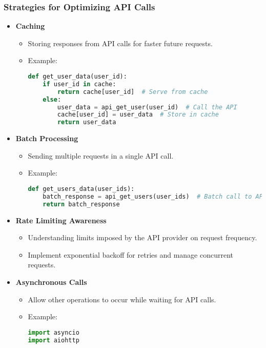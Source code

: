 \documentclass[aspectratio=169]{beamer}
\begin{document}
\begin{frame}[fragile]
    \frametitle{Strategies for Optimizing API Calls}
    \begin{itemize}
        \item \textbf{Caching}
        \begin{itemize}
            \item Storing responses from API calls for faster future requests.
            \item Example:
            \begin{lstlisting}[language=Python]
def get_user_data(user_id):
    if user_id in cache:
        return cache[user_id]  # Serve from cache
    else:
        user_data = api_get_user(user_id)  # Call the API
        cache[user_id] = user_data  # Store in cache
        return user_data
            \end{lstlisting}
        \end{itemize}
        
        \item \textbf{Batch Processing}
        \begin{itemize}
            \item Sending multiple requests in a single API call.
            \item Example:
            \begin{lstlisting}[language=Python]
def get_users_data(user_ids):
    batch_response = api_get_users(user_ids)  # Batch call to API
    return batch_response
            \end{lstlisting}
        \end{itemize}

        \item \textbf{Rate Limiting Awareness}
        \begin{itemize}
            \item Understanding limits imposed by the API provider on request frequency.
            \item Implement exponential backoff for retries and manage concurrent requests.
        \end{itemize}

        \item \textbf{Asynchronous Calls}
        \begin{itemize}
            \item Allow other operations to occur while waiting for API calls.
            \item Example:
            \begin{lstlisting}[language=Python]
import asyncio
import aiohttp


\end{lstlisting}
\end{itemize}
\end{itemize}
\end{frame}
\end{document}
